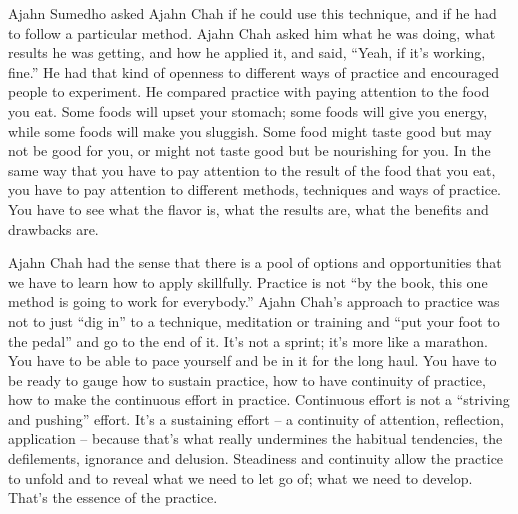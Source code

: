 \documentclass[a4paper,portrait,12pt]{article}
\begin{document}
 


Ajahn Sumedho asked Ajahn Chah if he could use this technique, and if
he had to follow a particular method.  Ajahn  Chah  asked  him  what
he  was doing,  what  results  he  was  getting,  and  how  he
applied  it,  and  said, ``Yeah,  if  it's  working,  fine.'' He had
that kind of openness to different ways of practice and encouraged
people to experiment.  He  compared  practice  with  paying
attention  to the  food  you  eat.  Some  foods  will  upset  your
stomach; some foods will give you energy, while some  foods  will
make  you  sluggish.  Some  food might taste good but may not be good
for you, or might  not  taste  good  but  be  nourishing  for  you.
In the same way that you have to pay attention to the result of the
food that you eat, you have to pay attention  to  different  methods,
techniques  and ways of practice. You have to see what the flavor is,
what  the  results  are,  what  the  benefits  and drawbacks are.  





Ajahn Chah had the sense that there is a pool of options  and
opportunities  that  we  have  to  learn how  to  apply  skillfully.
Practice  is  not  ``by  the book,  this  one  method  is  going  to
work  for everybody.''  Ajahn  Chah's  approach  to  practice was not
to just ``dig in'' to a technique, meditation or training and ``put
your foot to the pedal'' and go to the end of it. It's not a sprint;
it's more like a marathon. You  have  to  be  able  to  pace  yourself
and be in it for the long haul. You have to be ready to  gauge  how
to  sustain  practice,  how  to  have continuity    of    practice,
how    to    make    the continuous effort in practice. Continuous
effort is not a ``striving and pushing'' effort. It's a sustaining
effort  --  a  continuity  of  attention,  reflection,
application    --    because    that's    what    really
undermines     the     habitual     tendencies,     the defilements,
ignorance and delusion. Steadiness and continuity  allow  the
practice  to  unfold  and  to reveal what we need to let go of; what
we need to develop. That's the essence of the practice. 
\end{document}
